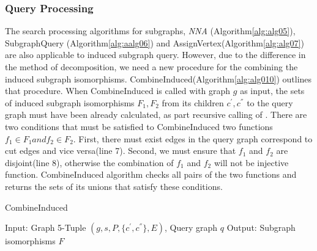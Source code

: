 \subsubsection{Query Processing}
The search processing algorithms for subgraphs, \textit{NNA} (Algorithm\ref{alg:alg05}), SubgraphQuery (Algorithm\ref{alg:aalg06}) and AssignVertex(Algorithm\ref{alg:alg07}) are also applicable to induced subgraph query. However, due to the difference in the method of decomposition, we need a new procedure for the combining the 
induced subgraph isomorphisms. CombineInduced(Algorithm\ref{alg:alg010}) outlines that procedure.
When CombineInduced is called with graph $g$ as input, the sets of induced subgraph isomorphisms $F_1, F_2$ from its children $c^{'}, c^{''}$ 
to the query graph must have been already calculated, as part recursive calling of \label{alg:aalg06}.
There are two conditions that must be satisfied to CombineInduced two functions $f_1 \in F_1 and f_2 \in F_2$.
First, there must exist edges in the query graph correspond to cut edges and vice versa(line 7).
Second, we must ensure that $f_1$ and $f_2$ are disjoint(line 8), otherwise the combination of $f_1$ and $f_2$ will not be injective function.
CombineInduced algorithm checks all pairs of the two functions and returns the sets of its unions that satisfy these conditions.

\begin{algorithm}[t]
\caption{CombineInduced}
\label{alg:alg010}
\begin{algorithmic}
\STATE Input:  Graph 5-Tuple $(g,s,P,\{c^{'},c^{''}\},E)$, Query graph $q$
\STATE Output: Subgraph isomorphisms $F$
\end{algorithmic}
\begin{algorithmic}[1]
\STATE $F_1 \leftarrow$CombineInduced$(c^{'},s_1 ,P_1 ,\{c_1^{'},c_1^{''}\},E_1 ,q)$
\STATE $F_2 \leftarrow$CombineInduced$(c^{''},s_2 ,P_2 ,\{c_2^{'},c_2^{''}\},E_2 ,q)$
\STATE $F \leftarrow \emptyset$
\STATE $E \leftarrow E_g - (E_1 \cup E_2 )$
                                \STATE $g \leftarrow (c^{'} \cup_{E} c^{''})$
                                \STATE $V_g \leftarrow f(V_{c^{'}} \cup V_{c^{''}} })$
                                \STATE $F \leftarrow  F \cup \{ f \} $
		\ENDIF
	\ENDIF
\ENDFOR
\RETURN $F$
\end{algorithmic}
\end{algorithm}

